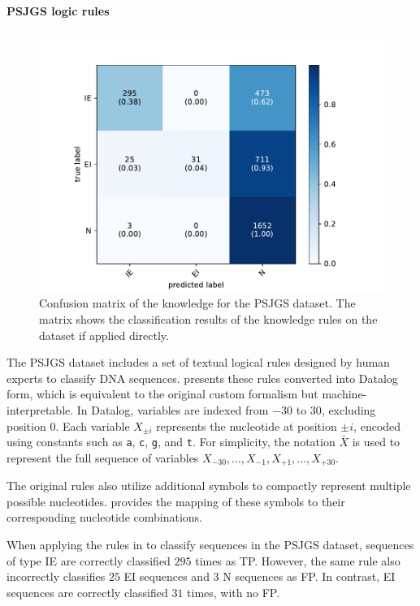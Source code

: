 \paragraph{\gls{PSJGS} logic rules}\label{par:kins-psjgs-logic-rules}
%

%
\begin{figure}
    \centering
    \includegraphics[width=0.8\linewidth]{figures/psjgs-rules-confusion-matrix}
    \caption[Confusion matrix of the knowledge for the PSJGS dataset]{
        Confusion matrix of the knowledge for the \gls{PSJGS} dataset.
        The matrix shows the classification results of the knowledge rules on the dataset if applied directly.
    }
    \label{fig:psjgs-rules-confusion-matrix}
\end{figure}
%
The \gls{PSJGS} dataset includes a set of textual logical rules designed by human experts to classify DNA sequences.
%
 presents these rules converted into Datalog form, which is equivalent to the original custom formalism but machine-interpretable.
%
In Datalog, variables are indexed from $-30$ to $30$, excluding position $0$.
%
Each variable $X_{\pm i}$ represents the nucleotide at position $\pm i$, encoded using constants such as \texttt{a}, \texttt{c}, \texttt{g}, and \texttt{t}.
%
For simplicity, the notation $\bar{X}$ is used to represent the full sequence of variables $X_{-30}, \dots, X_{-1}, X_{+1}, \dots, X_{+30}$.

The original rules also utilize additional symbols to compactly represent multiple possible nucleotides.
%
 provides the mapping of these symbols to their corresponding nucleotide combinations.

When applying the rules in  to classify sequences in the \gls{PSJGS} dataset, sequences of type \gls{IE} are correctly classified $295$ times as \gls{TP}.
%
However, the same rule also incorrectly classifies $25$ \gls{EI} sequences and $3$ N sequences as \gls{FP}.
%
In contrast, \gls{EI} sequences are correctly classified $31$ times, with no \gls{FP}.

